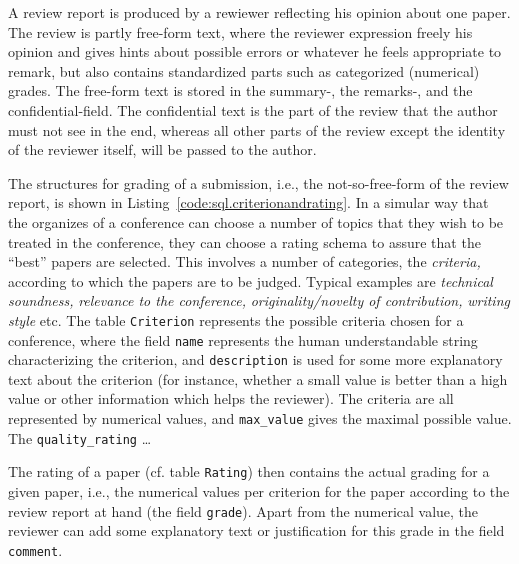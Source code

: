 
A review report is produced by a rewiewer reflecting his opinion about one
paper. The review is partly free-form text, where the reviewer expression
freely his opinion and gives hints about possible errors or whatever he feels
appropriate to remark, but also contains standardized parts such as
categorized (numerical) grades. The free-form text is stored in the summary-,
the remarks-, and the confidential-field. The confidential text is the part of
the review that the author must not see in the end, whereas all other parts of
the review except the identity of the reviewer itself, will be passed to the
author. 


%



The structures for grading of a submission, i.e., the not-so-free-form of
the review report, is shown in Listing~\ref{code:sql.criterionandrating}.
In a simular way that the organizes of a conference can choose a number of
topics that they wish to be treated in the conference, they can choose a
rating schema to assure that the ``best'' papers are selected.
%
This involves a number of categories, the \emph{criteria,} according to
which the papers are to be judged. Typical examples are \emph{technical
  soundness,} \emph{relevance to the conference,} \emph{originality/novelty
  of contribution,} \emph{writing style} etc. The table \texttt{Criterion}
represents the possible criteria chosen for a conference, where the field
\texttt{name} represents the human understandable string characterizing the
criterion, and \texttt{description} is used for some more explanatory text
about the criterion (for instance, whether a small value is better than a
high value or other information which helps the reviewer). The criteria are
all represented by numerical values, and \texttt{max\_value} gives the
maximal possible value. The \texttt{quality\_rating} \ldots

The rating of a paper (cf. table \texttt{Rating}) then contains the actual
grading for a given paper, i.e., the numerical values per criterion for the
paper according to the review report at hand (the field \texttt{grade}).
Apart from the numerical value, the reviewer can add some explanatory text
or justification for this grade in the field \texttt{comment}.


